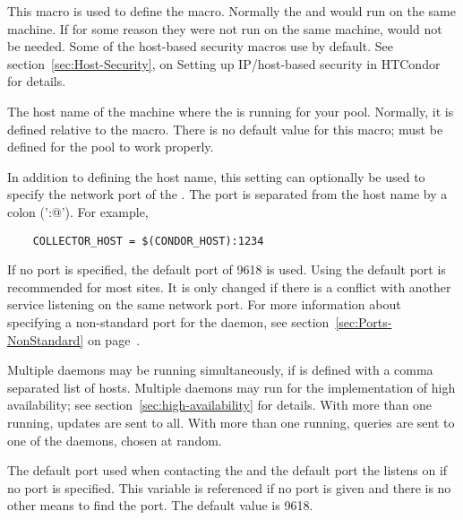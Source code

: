 \begin{description}
  
\label{param:CondorHost}
\item[\Macro{CONDOR\_HOST}]
  This macro is used to define the
   macro.  Normally the 
  and  would run on the same machine.  If for some
  reason they were not run on the same machine,
   would not be needed.  Some
  of the host-based security macros use  by
  default.  See section~\ref{sec:Host-Security}, on Setting up
  IP/host-based security in HTCondor for details.
  
\label{param:CollectorHost}
\item[\Macro{COLLECTOR\_HOST}]
  The host name of the machine where the  is running for
  your pool.  Normally, it is defined relative to
  the 
  macro.  There is no default value for this macro;
   must be defined for the pool to work
  properly.

  In addition to defining the host name, this setting can optionally be
  used to specify the network port of the .
  The port is separated from the host name by a colon ('\verb@:@').
  For example,
  \begin{verbatim}
    COLLECTOR_HOST = $(CONDOR_HOST):1234
  \end{verbatim}
  If no port is specified, the default port of 9618 is used.
  Using the default port is recommended for most sites.
  It is only changed if there is a conflict with another
  service listening on the same network port.
  For more information about specifying a non-standard port for the
   daemon,
  see section~\ref{sec:Ports-NonStandard} on
  page~\pageref{sec:Ports-NonStandard}.

  Multiple  daemons may be running simultaneously,
  if  is defined with a comma separated list of hosts.
  Multiple  daemons may run for the implementation of
  high availability; see section~\ref{sec:high-availability} for details.
  With more than one running, updates are sent to all.
  With more than one running, queries are sent to one of 
  the  daemons, chosen at random.

\label{param:CollectorPort}
\item[\Macro{COLLECTOR\_PORT}]
  The default port used when contacting the 
  and the default port the  listens on if
  no port is specified.
  This variable is referenced if no port is given
  and there is no other means to find the  port.
  The default value is 9618.


\end{description}
